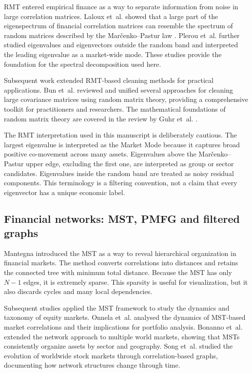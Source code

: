RMT entered empirical finance as a way to separate information from noise in large correlation matrices. Laloux et~al. \cite{laloux_1999_noise,laloux_2000_random} showed that a large part of the eigenspectrum of financial correlation matrices can resemble the spectrum of random matrices described by the Mar\v{c}enko--Pastur law \cite{marcenko_1967_distribution}. Plerou et~al. \cite{plerou_2002_random} further studied eigenvalues and eigenvectors outside the random band and interpreted the leading eigenvalue as a market-wide mode. These studies provide the foundation for the spectral decomposition used here.

Subsequent work extended RMT-based cleaning methods for practical applications. Bun et~al. \cite{bun_2017_cleaning} reviewed and unified several approaches for cleaning large covariance matrices using random matrix theory, providing a comprehensive toolkit for practitioners and researchers. The mathematical foundations of random matrix theory are covered in the review by Guhr et~al. \cite{guhr_muller_1998}.

The RMT interpretation used in this manuscript is deliberately cautious. The largest eigenvalue is interpreted as the Market Mode because it captures broad positive co-movement across many assets. Eigenvalues above the Mar\v{c}enko--Pastur upper edge, excluding the first one, are interpreted as group or sector candidates. Eigenvalues inside the random band are treated as noisy residual components. This terminology is a filtering convention, not a claim that every eigenvector has a unique economic label.

\subsection{Financial networks: MST, PMFG and filtered graphs}

Mantegna \cite{mantegna_1999_hierarchical} introduced the MST as a way to reveal hierarchical organization in financial markets. The method converts correlations into distances and retains the connected tree with minimum total distance. Because the MST has only $N-1$ edges, it is extremely sparse. This sparsity is useful for visualization, but it also discards cycles and many local dependencies.

Subsequent studies applied the MST framework to study the dynamics and taxonomy of equity markets. Onnela et~al. \cite{onnela_2003_dynamics} analysed the dynamics of MST-based market correlations and their implications for portfolio analysis. Bonanno et~al. \cite{bonanno_2004_networks} extended the network approach to multiple world markets, showing that MSTs consistently organize assets by sector and geography. Song et~al. \cite{song_2012_evolution} studied the evolution of worldwide stock markets through correlation-based graphs, documenting how network structures change through time.

